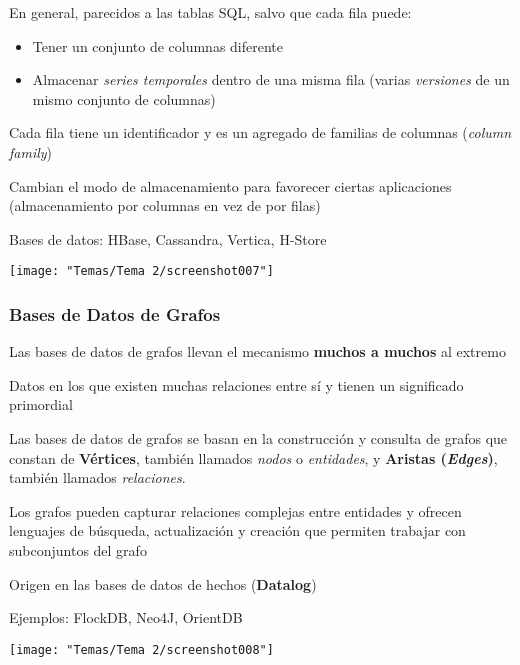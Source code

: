 En general, parecidos a las tablas SQL, salvo que cada fila puede:
\begin{itemize}
\item Tener un conjunto de columnas diferente
\item Almacenar \textit{series temporales} dentro de una misma fila (varias \textit{versiones} de un mismo conjunto de columnas)
\end{itemize}
Cada fila tiene un identificador y es un agregado de familias de columnas (\textit{column family})

Cambian el modo de almacenamiento para favorecer ciertas aplicaciones (almacenamiento por columnas en vez de por filas)

Bases de datos: HBase, Cassandra, Vertica, H-Store
\begin{center}
	\texttt{[image: "Temas/Tema 2/screenshot007"]}
\end{center}
\subsubsection{Bases de Datos de Grafos}
Las bases de datos de grafos llevan el mecanismo \textbf{muchos a muchos} al extremo

Datos en los que existen muchas relaciones entre sí y tienen un significado primordial

Las bases de datos de grafos se basan en la construcción y consulta de grafos que constan de \textbf{Vértices}, también llamados \textit{nodos} o \textit{entidades}, y \textbf{Aristas (\textit{Edges})}, también llamados \textit{relaciones}.

Los grafos pueden capturar relaciones complejas entre entidades y ofrecen lenguajes de búsqueda, actualización y creación que permiten trabajar con subconjuntos del grafo

Origen en las bases de datos de hechos (\textbf{Datalog})

Ejemplos: FlockDB, Neo4J, OrientDB

\begin{center}
	\texttt{[image: "Temas/Tema 2/screenshot008"]}
\end{center}

